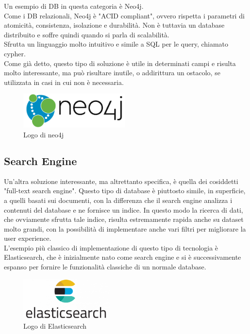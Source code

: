 \noindent Un esempio di DB in questa categoria è Neo4j.\\
Come i DB relazionali, Neo4j è "ACID compliant", ovvero rispetta i parametri di atomicità, consistenza, isolazione e durabilità. Non è tuttavia un database distribuito e soffre quindi quando si parla di scalabilità.\\
Sfrutta un linguaggio molto intuitivo e simile a SQL per le query, chiamato cypher.\\

\noindent Come già detto, questo tipo di soluzione è utile in determinati campi e risulta molto interessante, ma può risultare inutile, o addirittura un ostacolo, se utilizzata in casi in cui non è necessaria.

\begin{figure}[htbp]
\begin{center}
\includegraphics[height=5em]{immagini/tecnologies-logos/neo4j-logo.png}
\caption{Logo di neo4j}
\end{center}
\end{figure}

\subsection{Search Engine}
Un'altra soluzione interessante, ma altrettanto specifica, è quella dei cosiddetti "full-text search engine". Questo tipo di database è piuttosto simile, in superficie, a quelli basati sui documenti, con la differenza che il search engine analizza i contenuti del database e ne fornisce un indice. In questo modo la ricerca di dati, che ovviamente sfrutta tale indice, risulta estremamente rapida anche su dataset molto grandi, con la possibilità di implementare anche vari filtri per migliorare la user experience.\\

\noindent L'esempio più classico di implementazione di questo tipo di tecnologia è Elasticsearch, che è inizialmente nato come search engine e si è successivamente espanso per fornire le funzionalità classiche di un normale database.

\begin{figure}[htbp]
\begin{center}
\includegraphics[height=6em]{immagini/tecnologies-logos/Elasticsearch-Logo.png}
\caption{Logo di Elasticsearch}
\end{center}
\end{figure}

